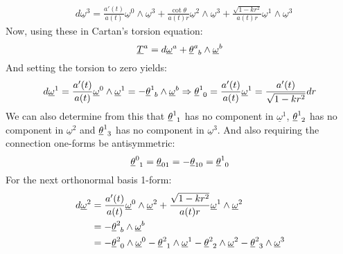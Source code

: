 \documentclass[12pt,a4]{article}
\begin{document}
\begin{enumerate}
\begin{align*}
      &d \underline{\omega} ^ 3 = \frac{a'(t)}{a(t)} \underline{\omega}^0 \wedge \underline{\omega}^3 + \frac{\cot{\theta}}{a(t) r} \underline{\omega}^2 \wedge \underline{\omega}^3 + \frac{\sqrt{1 - k r^2}}{a(t) r} \underline{\omega}^{1} \wedge \underline{\omega}^3
    \end{align*}
    Now, using these in Cartan's torsion equation:
    \begin{equation*}
      \underline{T}^a = d \underline{\omega}^a + \tensor{\underline{\theta}}{^a_b} \wedge \underline{\omega}^b
    \end{equation*}
    And setting the torsion to zero yields:
    \begin{equation*}
      d \underline{\omega} ^ 1 = \frac{a'(t)}{a(t)} \underline{\omega}^0 \wedge \underline{\omega}^1 = - \tensor{\underline{\theta}}{^1_b} \wedge \underline{\omega}^b \Rightarrow  \tensor{\underline{\theta}}{^1_0} = \frac{a'(t)}{a(t)} \underline{\omega}^1 = \frac{a'(t)}{\sqrt{1 - k r^2}} dr
    \end{equation*}
    We can also determine from this that $\tensor{\underline{\theta}}{^1_1}$ has no component in $\underline{\omega}^1$, $\tensor{\underline{\theta}}{^1_2}$ has no component in $\underline{\omega}^2$ and $\tensor{\underline{\theta}}{^1_3}$ has no component in $\underline{\omega}^3$.
    And also requiring the connection one-forms be antisymmetric:
    \begin{equation*}
      \tensor{\underline{\theta}}{^0_1} = \tensor{\underline{\theta}}{_0_1} = -\tensor{\underline{\theta}}{_1_0} = \tensor{\underline{\theta}}{^1_0}
    \end{equation*}
    For the next orthonormal basis 1-form:
    \begin{align*}
      d \underline{\omega} ^ 2 &= \frac{a'(t)}{a(t)} \underline{\omega}^0 \wedge \underline{\omega}^2 + \frac{\sqrt{1 - k r^2}}{a(t)r} \underline{\omega}^1 \wedge \underline{\omega}^2\\
                               &= - \tensor{\underline{\theta}}{^2_b} \wedge \underline{\omega}^b\\
                               &= - \tensor{\underline{\theta}}{^2_0} \wedge \underline{\omega}^0 -\tensor{\underline{\theta}}{^2_1} \wedge \underline{\omega}^1 - \tensor{\underline{\theta}}{^2_2} \wedge \underline{\omega}^2 - \tensor{\underline{\theta}}{^2_3} \wedge \underline{\omega}^3 

\end{align*}
\end{enumerate}
\end{document}
